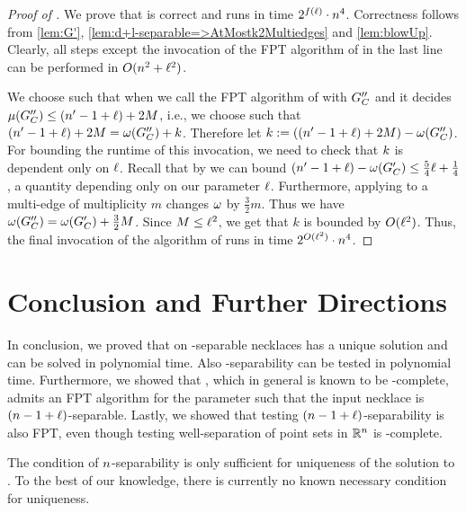 \documentclass[a4paper,UKenglish,cleveref, thm-restate]{lipics-v2021}
\begin{document}
\begin{proof}[Proof of ]
We prove that  is correct and runs in time $2^{f(\constB)}\cdot \dimension^4$. 
Correctness follows from \cref{lem:G'}, \cref{lem:d+l-separable=>AtMostk2Multiedges} and \cref{lem:blowUp}.
Clearly, all steps except the invocation of the FPT algorithm of  in the last line can be performed in $O(\dimension^2+\constB^2)$.


We choose \const such that when we call the FPT algorithm of  with $G_\Colors''$ and \const it decides $\mu(G_\Colors'')\leq (\dimension' -1 + \constB)+2M$, i.e., we
choose \const such that $(\dimension' - 1 +\constB)+2M= \bound(G_\Colors'')+\const$.
Therefore let $\const:=((\dimension'-1+\constB)+2M) - \bound(G_\Colors'')$.
For bounding the runtime of this invocation, we need to check that $\const$ is dependent only on $\constB$.
Recall that by  we can bound $(\dimension'-1+\constB)-\bound(G_\Colors')\leq \frac{5}{4}\constB+\frac{1}{4}$, a quantity depending only on our parameter $\constB$. Furthermore, applying  to a multi-edge of multiplicity $m$ changes $\omega$ by $\frac{3}{2}m$. Thus we have $\bound(G_\Colors'')=\bound(G_\Colors')+\frac{3}{2}M$. Since $M\leq\constB^2$, we get that $k$ is bounded by $O(\constB^2)$.
Thus, the final invocation of the algorithm of  runs in time $2^{O(\constB^2)}\cdot n^4$. 
\end{proof}




\section{Conclusion and Further Directions}

In conclusion, we proved that
\TwoThiefNecklaceSplitting on \dimension-separable necklaces has a unique solution and can be solved in polynomial time. Also \dimension-separability can be tested in polynomial time.
Furthermore, we showed that \TwoThiefNecklaceSplitting, which in general is known to be \PPA-complete, admits an FPT algorithm for the parameter \constB such that the input necklace is $(\dimension-1+\constB)$-separable. Lastly, we showed that testing $(\dimension-1+\constB)$-separability is also FPT, even though testing well-separation of point sets in $\Reals^\dimension$ is \coNP-complete.

The condition of $\dimension$-separability is only sufficient for uniqueness of the solution to \TwoThiefNecklaceSplitting. To the best of our knowledge, there is currently no known necessary condition for uniqueness.
\end{document}

